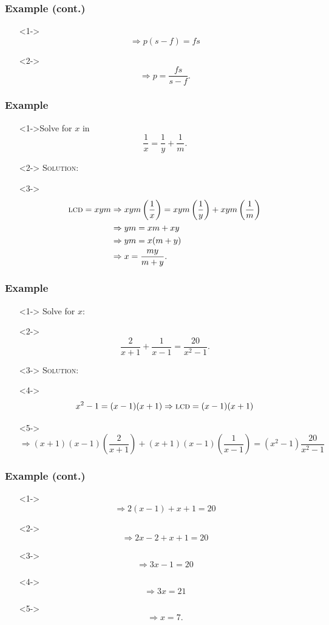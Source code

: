 \documentclass[handout]{beamer}
\begin{document}
\begin{frame}
	\frametitle{Example (cont.)}
	\begin{enumerate}
		\item[]<1-> \[ \Rightarrow p(s-f)=fs \]
		\item[]<2-> \[ \Rightarrow p=\frac{fs}{s-f}. \]
	\end{enumerate}
\end{frame}

\begin{frame}
	\frametitle{Example}
	\begin{enumerate}
		\item[]<1->Solve for $x$ in
		\[
			\frac{1}{x}=\frac{1}{y}+\frac{1}{m}.
		\]
		\item[]<2-> \textsc{Solution:}
		\item[]<3->
		\begin{align*}
			\text{\textsc{lcd}}=xym & \Rightarrow xym \left( \frac{1}{x}\right)=xym \left( \frac{1}{y}\right)+xym \left( \frac{1}{m} \right)  \\
			& \Rightarrow ym=xm+xy \\
			& \Rightarrow ym=x(m+y) \\
			& \Rightarrow x=\frac{my}{m+y}.
		\end{align*}
	\end{enumerate}
\end{frame}

\begin{frame}
	\frametitle{Example}
	\begin{enumerate}
		\item[]<1-> Solve for $x$:
		\item[]<2-> \[ \frac{2}{x+1}+\frac{1}{x-1}=\frac{20}{x^{2}-1}. \]
		\item[]<3-> \textsc{Solution:}
		\item[]<4-> \[ x^{2}-1=(x-1)(x+1) \Rightarrow \text{\textsc{lcd}}=(x-1)(x+1) \]
		\item[]<5-> \[ \Rightarrow (x+1)(x-1) \left( \frac{2}{x+1} \right) +(x+1)(x-1) \left( \frac{1}{x-1} \right)=(x^{2}-1) \frac{20}{x^{2}-1} \]
	\end{enumerate}
\end{frame}

\begin{frame}
	\frametitle{Example (cont.)}
	\begin{enumerate}
		\item[]<1-> \[ \Rightarrow 2(x-1)+x+1=20 \]
		\item[]<2-> \[ \Rightarrow 2x-2+x+1=20 \]
		\item[]<3-> \[ \Rightarrow 3x-1=20 \]
		\item[]<4-> \[ \Rightarrow 3x=21 \]
		\item[]<5-> \[ \Rightarrow x=7. \]
	\end{enumerate}
\end{frame}
\end{document}
